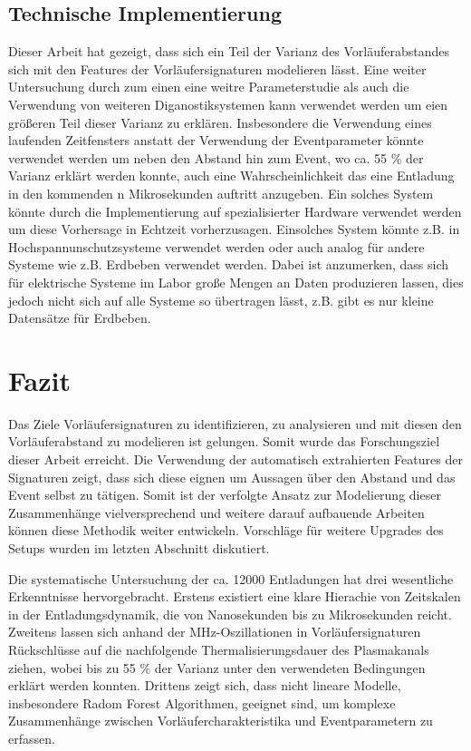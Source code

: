 \subsection{Technische Implementierung}
Dieser Arbeit hat gezeigt, dass sich ein Teil der Varianz des Vorläuferabstandes sich mit den Features der Vorläufersignaturen modelieren lässt. Eine weiter Untersuchung durch zum einen eine weitre Parameterstudie als auch die Verwendung von weiteren Diganostiksystemen kann verwendet werden um eien größeren Teil dieser Varianz zu erklären. Insbesondere die Verwendung eines laufenden Zeitfensters anstatt der Verwendung der Eventparameter könnte verwendet werden um neben den Abstand hin zum Event, wo ca. 55 \% der Varianz erklärt werden konnte, auch eine Wahrscheinlichkeit das eine Entladung in den kommenden n Mikrosekunden auftritt anzugeben. Ein solches System könnte durch die Implementierung auf spezialisierter Hardware verwendet werden um diese Vorhersage in Echtzeit vorherzusagen. Einsolches System könnte z.B. in Hochspannunschutzsysteme verwendet werden oder auch analog für andere Systeme wie z.B. Erdbeben verwendet werden. Dabei ist anzumerken, dass sich für elektrische Systeme im Labor große Mengen an Daten produzieren lassen, dies jedoch nicht sich auf alle Systeme so übertragen lässt, z.B. gibt es nur kleine Datensätze für Erdbeben.

\section{Fazit}
Das Ziele Vorläufersignaturen zu identifizieren, zu analysieren und mit diesen den Vorläuferabstand zu modelieren ist gelungen. Somit wurde das Forschungsziel dieser Arbeit erreicht. Die Verwendung der automatisch extrahierten Features der Signaturen zeigt, dass sich diese eignen um Aussagen über den Abstand und das Event selbst zu tätigen. Somit ist der verfolgte Ansatz zur Modelierung dieser Zusammenhänge vielversprechend und weitere darauf aufbauende Arbeiten können diese Methodik weiter entwickeln. Vorschläge für weitere Upgrades des Setups wurden im letzten Abschnitt diskutiert. 

Die systematische Untersuchung der ca. 12000 Entladungen hat drei wesentliche Erkenntnisse hervorgebracht. Erstens existiert eine klare Hierachie von Zeitskalen in der Entladungsdynamik, die von Nanosekunden bis zu Mikrosekunden reicht. Zweitens lassen sich anhand der MHz-Oszillationen in Vorläufersignaturen Rückschlüsse auf die nachfolgende Thermalisierungsdauer des Plasmakanals ziehen, wobei bis zu 55 \% der Varianz unter den verwendeten Bedingungen erklärt werden konnten. Drittens zeigt sich, dass nicht lineare Modelle, insbesondere Radom Forest Algorithmen, geeignet sind, um komplexe Zusammenhänge zwischen Vorläufercharakteristika und Eventparametern zu erfassen. 

